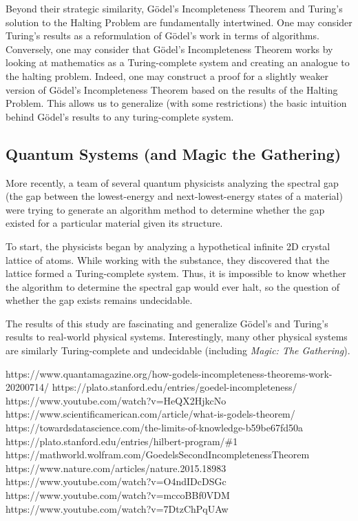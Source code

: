 \documentclass[conference]{IEEEtran}
\begin{document}
Beyond their strategic similarity, Gödel's Incompleteness Theorem and Turing's solution to the Halting Problem are fundamentally intertwined. One may consider Turing's results as a reformulation of Gödel's work in terms of algorithms. Conversely, one may consider that Gödel's Incompleteness Theorem works by looking at mathematics as a Turing-complete system and creating an analogue to the halting problem. Indeed, one may construct a proof for a slightly weaker version of Gödel's Incompleteness Theorem based on the results of the Halting Problem. This allows us to generalize (with some restrictions) the basic intuition behind Gödel's results to any turing-complete system. \bigskip 

\subsection{Quantum Systems (and Magic the Gathering)} 
More recently, a team of several quantum physicists analyzing the spectral gap (the gap between the lowest-energy and next-lowest-energy states of a material) were trying to generate an algorithm method to determine whether the gap existed for a particular material given its structure.

To start, the physicists began by analyzing a hypothetical infinite 2D crystal lattice of atoms. While working with the substance, they discovered that the lattice formed a Turing-complete system. Thus, it is impossible to know whether the algorithm to determine the spectral gap would ever halt, so the question of whether the gap exists remains undecidable. 

The results of this study are fascinating and generalize Gödel's and Turing's results to real-world physical systems. Interestingly, many other physical systems are similarly Turing-complete and undecidable (including \emph{Magic: The Gathering}).

\begin{thebibliography}{00}
     https://www.quantamagazine.org/how-godels-incompleteness-theorems-work-20200714/
     https://plato.stanford.edu/entries/goedel-incompleteness/
     https://www.youtube.com/watch?v=HeQX2HjkcNo
     https://www.scientificamerican.com/article/what-is-godels-theorem/
     https://towardsdatascience.com/the-limits-of-knowledge-b59be67fd50a
     https://plato.stanford.edu/entries/hilbert-program/\#1
     https://mathworld.wolfram.com/GoedelsSecondIncompletenessTheorem
     https://www.nature.com/articles/nature.2015.18983
     https://www.youtube.com/watch?v=O4ndIDcDSGc
     https://www.youtube.com/watch?v=mccoBBf0VDM
     https://www.youtube.com/watch?v=7DtzChPqUAw
\end{thebibliography}
\end{document}
